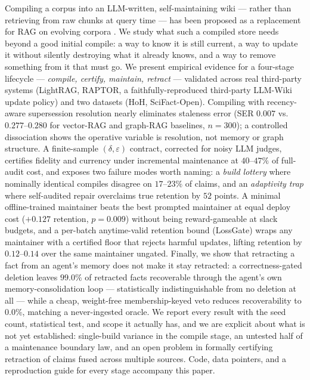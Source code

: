 Compiling a corpus into an LLM-written, self-maintaining wiki --- rather than retrieving from raw chunks at query time --- has been proposed as a replacement for RAG on evolving corpora \citep{karpathy2026wiki}. We study what such a compiled store needs beyond a good initial compile: a way to know it is still current, a way to update it without silently destroying what it already knows, and a way to remove something from it that must go. We present empirical evidence for a four-stage lifecycle --- \emph{compile, certify, maintain, retract} --- validated across real third-party systems (LightRAG, RAPTOR, a faithfully-reproduced third-party LLM-Wiki update policy) and two datasets (HoH, SciFact-Open). Compiling with recency-aware supersession resolution nearly eliminates staleness error (SER $0.007$ vs.\ $0.277$--$0.280$ for vector-RAG and graph-RAG baselines, $n{=}300$); a controlled dissociation shows the operative variable is resolution, not memory or graph structure. A finite-sample $(\delta,\varepsilon)$ contract, corrected for noisy LLM judges, certifies fidelity and currency under incremental maintenance at $40$--$47\%$ of full-audit cost, and exposes two failure modes worth naming: a \emph{build lottery} where nominally identical compiles disagree on $17$--$23\%$ of claims, and an \emph{adaptivity trap} where self-audited repair overclaims true retention by $52$ points. A minimal offline-trained maintainer beats the best prompted maintainer at equal deploy cost ($+0.127$ retention, $p{=}0.009$) without being reward-gameable at slack budgets, and a per-batch anytime-valid retention bound (LossGate) wraps any maintainer with a certified floor that rejects harmful updates, lifting retention by $0.12$--$0.14$ over the same maintainer ungated. Finally, we show that retracting a fact from an agent's memory does not make it stay retracted: a correctness-gated deletion leaves $99.0\%$ of retracted facts recoverable through the agent's own memory-consolidation loop --- statistically indistinguishable from no deletion at all --- while a cheap, weight-free membership-keyed veto reduces recoverability to $0.0\%$, matching a never-ingested oracle. We report every result with the seed count, statistical test, and scope it actually has, and we are explicit about what is not yet established: single-build variance in the compile stage, an untested half of a maintenance boundary law, and an open problem in formally certifying retraction of claims fused across multiple sources. Code, data pointers, and a reproduction guide for every stage accompany this paper.
